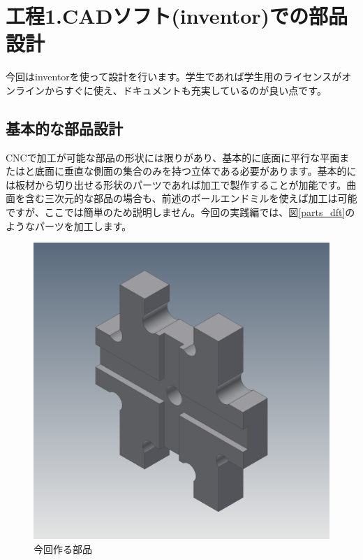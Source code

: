 \documentclass[b5paper, 9pt, twocolumn, titlepage,openany]{jsbook}%
\begin{document}
\clearpage
\section{工程1.CADソフト(inventor)での部品設計}
今回はinventorを使って設計を行います。学生であれば学生用のライセンスがオンラインからすぐに使え、ドキュメントも充実しているのが良い点です。\\

\subsection{基本的な部品設計}
CNCで加工が可能な部品の形状には限りがあり、基本的に底面に平行な平面またはと底面に垂直な側面の集合のみを持つ立体である必要があります。基本的には板材から切り出せる形状のパーツであれば加工で製作することが加能です。曲面を含む三次元的な部品の場合も、前述のボールエンドミルを使えば加工は可能ですが、ここでは簡単のため説明しません。今回の実践編では、図\ref{parts_dft}のようなパーツを加工します。\\

\begin{figure}[tbh]
  \begin{center}
    \begin{minipage}{0.9\columnwidth}
      \includegraphics[width=\columnwidth]{piece_1_hoge.png}
      \caption{今回作る部品    \label{parts}}
    \end{minipage}
  \end{center}
\end{figure}
\end{document}
